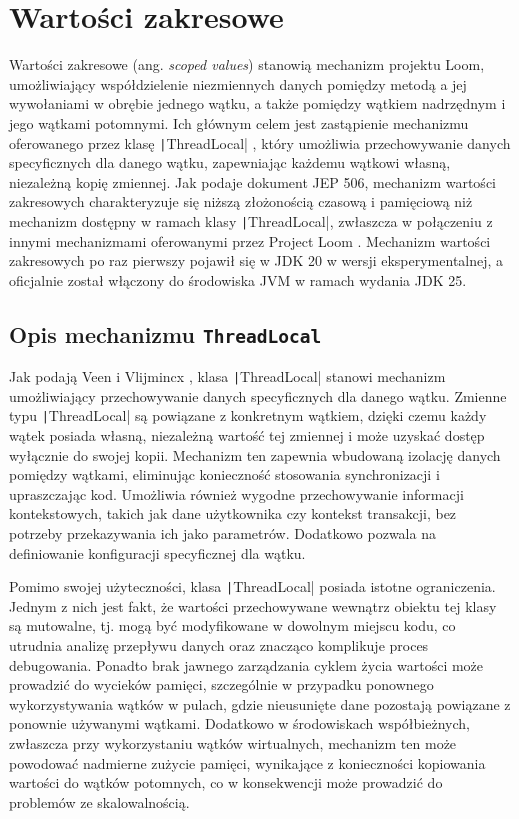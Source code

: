 \section{Wartości zakresowe}
Wartości zakresowe (ang. \emph{scoped values}) stanowią mechanizm projektu Loom, umożliwiający współdzielenie niezmiennych danych pomiędzy metodą a jej wywołaniami w obrębie jednego wątku, a także pomiędzy wątkiem nadrzędnym i jego wątkami potomnymi. Ich głównym celem jest zastąpienie mechanizmu oferowanego przez klasę \texttt|ThreadLocal| \cite{java-thread-local}, który umożliwia przechowywanie danych specyficznych dla danego wątku, zapewniając każdemu wątkowi własną, niezależną kopię zmiennej. Jak podaje dokument JEP 506, mechanizm wartości zakresowych charakteryzuje się niższą złożonością czasową i pamięciową niż mechanizm dostępny w ramach klasy \texttt|ThreadLocal|, zwłaszcza w połączeniu z innymi mechanizmami oferowanymi przez Project Loom \cite{jep506}.
Mechanizm wartości zakresowych po raz pierwszy pojawił się w JDK 20 w wersji eksperymentalnej, a oficjalnie został włączony do środowiska JVM w ramach wydania JDK 25. 

\subsection{Opis mechanizmu \texttt{ThreadLocal}}
Jak podają Veen i Vlijmincx \cite{veen2024}, klasa \texttt|ThreadLocal| stanowi mechanizm umożliwiający przechowywanie danych specyficznych dla danego wątku. Zmienne typu \texttt|ThreadLocal| są powiązane z konkretnym wątkiem, dzięki czemu każdy wątek posiada własną, niezależną wartość tej zmiennej i może uzyskać dostęp wyłącznie do swojej kopii.
Mechanizm ten zapewnia wbudowaną izolację danych pomiędzy wątkami, eliminując konieczność stosowania synchronizacji i upraszczając kod. Umożliwia również wygodne przechowywanie informacji kontekstowych, takich jak dane użytkownika czy kontekst transakcji, bez potrzeby przekazywania ich jako parametrów. Dodatkowo pozwala na definiowanie konfiguracji specyficznej dla wątku. \cite{veen2024,java-thread-local}

Pomimo swojej użyteczności, klasa \texttt|ThreadLocal| posiada istotne ograniczenia. Jednym z nich jest fakt, że wartości przechowywane wewnątrz obiektu tej klasy są mutowalne, tj. mogą być modyfikowane w dowolnym miejscu kodu, co utrudnia analizę przepływu danych oraz znacząco komplikuje proces debugowania. Ponadto brak jawnego zarządzania cyklem życia wartości może prowadzić do wycieków pamięci, szczególnie w przypadku ponownego wykorzystywania wątków w pulach, gdzie nieusunięte dane pozostają powiązane z ponownie używanymi wątkami. Dodatkowo w środowiskach współbieżnych, zwłaszcza przy wykorzystaniu wątków wirtualnych, mechanizm ten może powodować nadmierne zużycie pamięci, wynikające z konieczności kopiowania wartości do wątków potomnych, co w konsekwencji może prowadzić do problemów ze skalowalnością. \cite{veen2024,java-thread-local}

